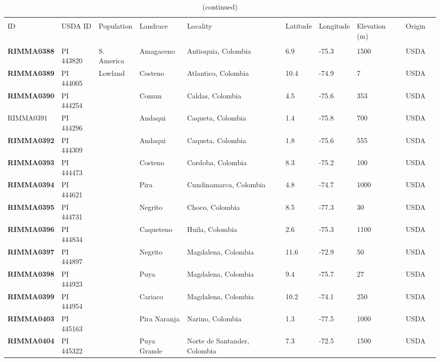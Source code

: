 \clearpage

\setcounter{table}{0}
\renewcommand{\arraystretch}{1.2}

\begin{table}[h]
    \begin{center}
    \caption[]{(continued)\hspace*{13.5cm}}  
{\fontsize{7}{10}\selectfont
    \begin{tabular}{llllllllll}
        \hline\hline
       & & & \\[-4mm] 
	 ID	&	USDA ID	&	Population	&	Landrace	&	Locality	&	Latitude	&	Longitude	&	Elevation (m)	&	Origin	\\[0.0cm]
	\hline 
	& & & \\[-4mm] 
{\bf RIMMA0388}	&	PI 443820	&	S. America	&	Amagaceno	&	Antioquia, Colombia	&	6.9 	&	-75.3 	&	1500	&	USDA	\\
{\bf RIMMA0389}	&	PI 444005	&	Lowland	&	Costeno	&	Atlantico, Colombia	&	10.4 	&	-74.9 	&	7	&	USDA	\\
{\bf RIMMA0390}	&	PI 444254	&		&	Comun	&	Caldas, Colombia	&	4.5 	&	-75.6 	&	353	&	USDA	\\
RIMMA0391	&	PI 444296	&		&	Andaqui	&	Caqueta, Colombia	&	1.4 	&	-75.8 	&	700	&	USDA	\\
{\bf RIMMA0392}	&	PI 444309	&		&	Andaqui	&	Caqueta, Colombia	&	1.8 	&	-75.6 	&	555	&	USDA	\\
{\bf RIMMA0393}	&	PI 444473	&		&	Costeno	&	Cordoba, Colombia	&	8.3 	&	-75.2 	&	100	&	USDA	\\
{\bf RIMMA0394}	&	PI 444621	&		&	Pira	&	Cundinamarca, Colombia	&	4.8 	&	-74.7 	&	1000	&	USDA	\\
{\bf RIMMA0395}	&	PI 444731	&		&	Negrito	&	Choco, Colombia	&	8.5 	&	-77.3 	&	30	&	USDA	\\
{\bf RIMMA0396}	&	PI 444834	&		&	Caqueteno	&	Huila, Colombia	&	2.6 	&	-75.3 	&	1100	&	USDA	\\
{\bf RIMMA0397}	&	PI 444897	&		&	Negrito	&	Magdalena, Colombia	&	11.6 	&	-72.9 	&	50	&	USDA	\\
{\bf RIMMA0398}	&	PI 444923	&		&	Puya	&	Magdalena, Colombia	&	9.4 	&	-75.7 	&	27	&	USDA	\\
{\bf RIMMA0399}	&	PI 444954	&		&	Cariaco	&	Magdalena, Colombia	&	10.2 	&	-74.1 	&	250	&	USDA	\\
{\bf RIMMA0403}	&	PI 445163	&		&	Pira Naranja	&	Narino, Colombia	&	1.3 	&	-77.5 	&	1000	&	USDA	\\
{\bf RIMMA0404}	&	PI 445322	&		&	Puya Grande	&	Norte de Santander, Colombia	&	7.3 	&	-72.5 	&	1500	&	USDA	\\

\end{tabular}}
\end{center}
\end{table}
